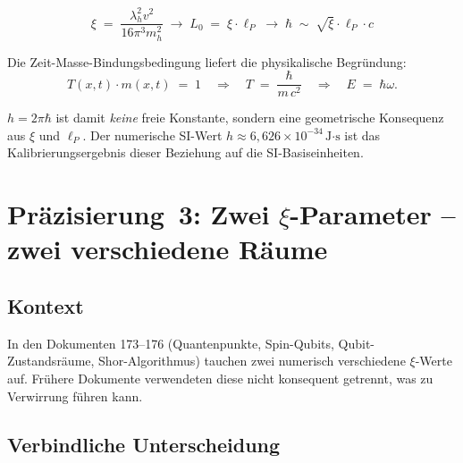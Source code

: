 \begin{equation}
  \xi \;=\; \frac{\lambda_h^2 v^2}{16\pi^3 m_h^2}
  \;\longrightarrow\;
  L_0 \;=\; \xi \cdot \ell_P
  \;\longrightarrow\;
  \hbar \;\sim\; \sqrt{\xi}\cdot \ell_P \cdot c
  \tag{190.8}
\end{equation}

Die Zeit-Masse-Bindungsbedingung liefert die physikalische Begründung:
\begin{equation}
  T(x,t)\cdot m(x,t) \;=\; 1
  \quad\Longrightarrow\quad
  T \;=\; \frac{\hbar}{m\, c^2}
  \quad\Longrightarrow\quad
  E \;=\; \hbar\omega.
  \tag{190.9}
\end{equation}

$h = 2\pi\hbar$ ist damit \emph{keine} freie Konstante, sondern eine
geometrische Konsequenz aus $\xi$ und $\ell_P$. Der numerische SI-Wert
$h \approx 6{,}626 \times 10^{-34}\,\text{J·s}$ ist das
Kalibrierungsergebnis dieser Beziehung auf die SI-Basiseinheiten.

\section{\texorpdfstring{Präzisierung~3: Zwei $\xi$-Parameter -- zwei verschiedene Räume}{Praezisierung 3: Zwei xi-Parameter -- zwei verschiedene Raeume}}

\subsection*{Kontext}

In den Dokumenten 173--176 (Quantenpunkte, Spin-Qubits, Qubit-Zustandsräume,
Shor-Algorithmus) tauchen zwei numerisch verschiedene $\xi$-Werte auf.
Frühere Dokumente verwendeten diese nicht konsequent getrennt, was zu
Verwirrung führen kann.

\subsection*{Verbindliche Unterscheidung}

\begin{center}
{\footnotesize
{}
}
\end{center}

